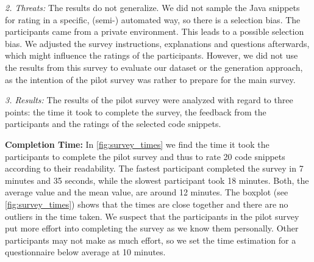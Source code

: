 \documentclass[%
class=scrreprt,
chapterprefix=false,%
open=right,%
twoside=false,%
paper=a4,%
logofile={Logo\_zentral\_farbig\_EN.png},%
thesistype=master,%
UKenglish,%
]{se2thesis}
\theoremstyle{definition}
\begin{document}
	\textit{2. Threats:}
	The results do not generalize. We did not sample the Java snippets for rating in a specific, (semi-) automated way, so there is a selection bias. The participants came from a private environment. This leads to a possible selection bias.
	We adjusted the survey instructions, explanations and questions afterwards, which might influence the ratings of the participants.
	However, we did not use the results from this survey to evaluate our dataset or the generation approach, as the intention of the pilot survey was rather to prepare for the main survey. 
	
	\textit{3. Results:}
	The results of the pilot survey were analyzed with regard to three points: the time it took to complete the survey, the feedback from the participants and the ratings of the selected code snippets.
	
	\textbf{Completion Time:} 
	In \autoref{fig:survey_times} we find the time it took the participants to complete the pilot survey and thus to rate 20 code snippets according to their readability. 
	The fastest participant completed the survey in 7 minutes and 35 seconds, while the slowest participant took 18 minutes. 
	Both, the average value and the mean value, are around 12 minutes. The boxplot (see \autoref{fig:survey_times}) shows that the times are close together and there are no outliers in the time taken.
	We suspect that the participants in the pilot survey put more effort into completing the survey as we know them personally. 
	Other participants may not make as much effort, so we set the time estimation for a questionnaire below average at 10 minutes.
		
\end{document}
